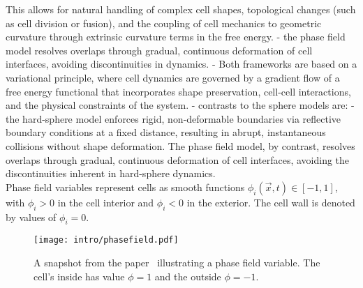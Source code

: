 This allows for natural handling of complex cell shapes, topological changes (such as cell division or fusion), and the coupling of cell mechanics to geometric curvature through extrinsic curvature terms in the free energy. 
- the phase field model resolves overlaps through gradual, continuous deformation of cell interfaces, avoiding discontinuities in dynamics. 
- Both frameworks are based on a variational principle, where cell dynamics are governed by a gradient flow of a free energy functional that incorporates shape preservation, cell-cell interactions, and the physical constraints of the system. 
- contrasts to the sphere models are: 
- the hard-sphere model enforces rigid, non-deformable boundaries via reflective boundary conditions at a fixed distance, resulting in abrupt, instantaneous collisions without shape deformation.  The phase field model, by contrast, resolves overlaps through gradual, continuous deformation of cell interfaces, avoiding the discontinuities inherent in hard-sphere dynamics. \\

Phase field variables represent cells as smooth functions $\phi_i(\vec{x}, t) \in [-1, 1]$, with $\phi_i > 0$ in the cell interior and $\phi_i <0$ in the exterior. 
The cell wall is denoted by values of $\phi_i = 0$. \\
\begin{figure}[h!]
	\centering
	\texttt{[image: intro/phasefield.pdf]}
	\caption{A snapshot from the paper~\cite{alert2020} illustrating a phase field variable. 
	The cell's inside has value $\phi = 1$ and the outside $\phi = -1$. 
	}
	\label{fig:phasefield}
\end{figure}
	
